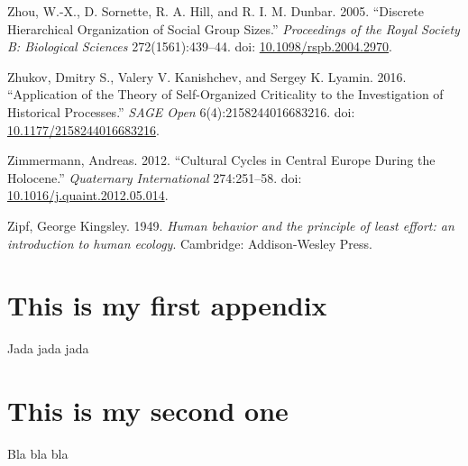 \documentclass[
  12pt,
]{book}
\newlength{\cslhangindent}
\newlength{\cslentryspacingunit} %
\newenvironment{CSLReferences}[2] %
 {%
  \setlength{\parindent}{0pt}
  \ifodd #1
  \let\oldpar\par
  \def\par{\hangindent=\cslhangindent\oldpar}
  \fi
  \setlength{\parskip}{#2\cslentryspacingunit}
 }%
 {}
\begin{document}
\begin{CSLReferences}{1}{0}
\leavevmode{}%
Zhou, W.-X., D. Sornette, R. A. Hill, and R. I. M. Dunbar. 2005. {``Discrete Hierarchical Organization of Social Group Sizes.''} \emph{Proceedings of the Royal Society B: Biological Sciences} 272(1561):439--44. doi: \href{https://doi.org/10.1098/rspb.2004.2970}{10.1098/rspb.2004.2970}.

\leavevmode{}%
Zhukov, Dmitry S., Valery V. Kanishchev, and Sergey K. Lyamin. 2016. {``Application of the {Theory} of {Self-Organized Criticality} to the {Investigation} of {Historical Processes}.''} \emph{SAGE Open} 6(4):2158244016683216. doi: \href{https://doi.org/10.1177/2158244016683216}{10.1177/2158244016683216}.

\leavevmode{}%
Zimmermann, Andreas. 2012. {``Cultural Cycles in {Central Europe} During the {Holocene}.''} \emph{Quaternary International} 274:251--58. doi: \href{https://doi.org/10.1016/j.quaint.2012.05.014}{10.1016/j.quaint.2012.05.014}.

\leavevmode{}%
Zipf, George Kingsley. 1949. \emph{Human behavior and the principle of least effort: an introduction to human ecology}. Cambridge: Addison-Wesley Press.

\end{CSLReferences}

\hypertarget{appendix-appendix}{%
\appendix {}}


\hypertarget{this-is-my-first-appendix}{%
\chapter{This is my first appendix}\label{this-is-my-first-appendix}}

Jada jada jada

\hypertarget{this-is-my-second-one}{%
\chapter{This is my second one}\label{this-is-my-second-one}}

Bla bla bla
\end{document}
